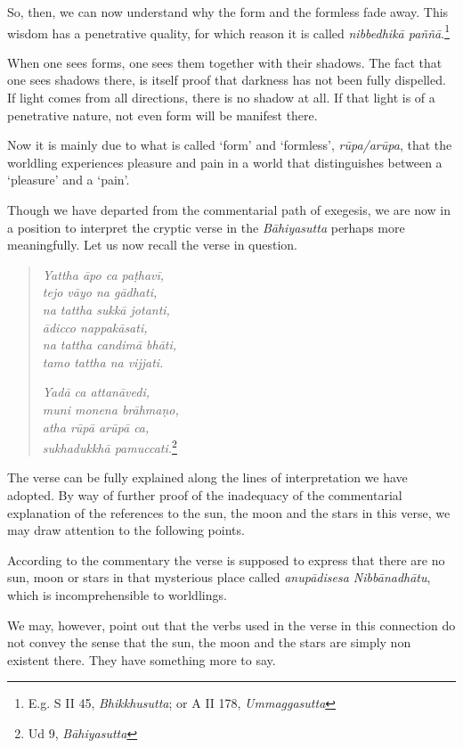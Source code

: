 So, then, we can now understand why the form and the formless fade away. This wisdom has a penetrative quality, for which reason it is called \emph{nibbedhikā paññā}.\footnote{E.g. S II 45, \emph{Bhikkhusutta}; or A II 178, \emph{Ummaggasutta}}

When one sees forms, one sees them together with their shadows. The fact that one sees shadows there, is itself proof that darkness has not been fully dispelled. If light comes from all directions, there is no shadow at all. If that light is of a penetrative nature, not even form will be manifest there.

Now it is mainly due to what is called `form' and `formless', \emph{rūpa/arūpa}, that the worldling experiences pleasure and pain in a world that distinguishes between a `pleasure' and a `pain'.

Though we have departed from the commentarial path of exegesis, we are now in a position to interpret the cryptic verse in the \emph{Bāhiyasutta} perhaps more meaningfully. Let us now recall the verse in question.

\begin{quote}
\emph{Yattha āpo ca paṭhavī,}\\
\emph{tejo vāyo na gādhati,}\\
\emph{na tattha sukkā jotanti,}\\
\emph{ādicco nappakāsati,}\\
\emph{na tattha candimā bhāti,}\\
\emph{tamo tattha na vijjati.}

\emph{Yadā ca attanāvedi,}\\
\emph{muni monena brāhmaṇo,}\\
\emph{atha rūpā arūpā ca,}\\
\emph{sukhadukkhā pamuccati.}\footnote{Ud 9, \emph{Bāhiyasutta}}
\end{quote}

The verse can be fully explained along the lines of interpretation we have adopted. By way of further proof of the inadequacy of the commentarial explanation of the references to the sun, the moon and the stars in this verse, we may draw attention to the following points.

According to the commentary the verse is supposed to express that there are no sun, moon or stars in that mysterious place called \emph{anupādisesa Nibbānadhātu}, which is incomprehensible to worldlings.

We may, however, point out that the verbs used in the verse in this connection do not convey the sense that the sun, the moon and the stars are simply non existent there. They have something more to say.

